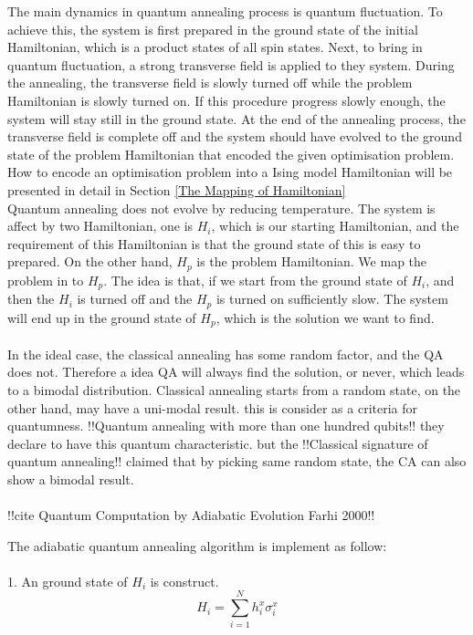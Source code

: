 \documentclass[twoside,a4paper,article]{combine}
\begin{document}
The main dynamics in quantum annealing process is quantum fluctuation. To achieve this, the system is first prepared in the ground state of the initial Hamiltonian, which is a product states of all spin states. Next, to bring in quantum fluctuation, a strong transverse field is applied to they system. During the annealing, the transverse field is slowly turned off while the problem Hamiltonian is slowly turned on. If this procedure progress slowly enough, the system will stay still in the ground state. At the end of the annealing process, the transverse field is complete off and the system should have evolved to the ground state of the problem Hamiltonian that encoded the given optimisation problem. How to encode an optimisation problem into a Ising model Hamiltonian will be presented in detail in Section \ref{The Mapping of Hamiltonian} \\



Quantum annealing does not evolve by reducing temperature. The system is affect by two Hamiltonian, one is $H_i$, which is our starting Hamiltonian, and the requirement of this Hamiltonian is that the ground state of this is easy to prepared. On the other hand, $H_p$ is the problem Hamiltonian. We map the problem in to $H_p$. The idea is that, if we start from the ground state of $H_i$, and then the $H_i$ is turned off and the $H_p$ is turned on sufficiently slow. The system will end up in the ground state of $H_p$, which is the solution we want to find.\\
\\
In the ideal case, the classical annealing has some random factor, and the QA does not. Therefore a idea QA will always find the solution, or never, which leads to a bimodal distribution. Classical annealing starts from a random state, on the other hand, may have a uni-modal result. this is consider as a criteria for quantumness. !!Quantum annealing with more than one hundred qubits!! they declare to have this quantum characteristic. but the !!Classical signature of quantum annealing!! claimed that by picking same random state, the CA can also show a bimodal result. \\
\\

!!cite Quantum Computation by Adiabatic Evolution Farhi 2000!!

The adiabatic quantum annealing algorithm is implement as follow:\\
\\
1. An ground state of $H_i$ is construct.
\begin{equation*}
	H_i=\sum_{i=1}^{N}h_i^x \sigma_i^x
\end{equation*}   
\end{document}
